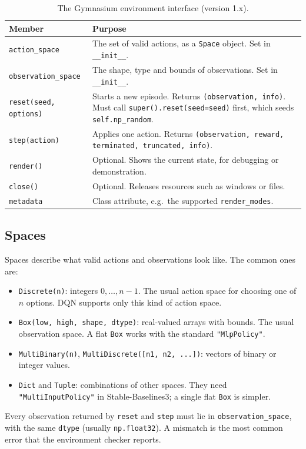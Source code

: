\documentclass[11pt,a4paper]{article}
\begin{document}
\begin{table}[h]
\centering\small
\caption{The Gymnasium environment interface (version 1.x).}
\label{tab:api}
\begin{tabularx}{\textwidth}{@{}p{4.1cm}L@{}}
\toprule
Member & Purpose \\
\midrule
\texttt{action\_space} & The set of valid actions, as a \texttt{Space} object. Set in \texttt{\_\_init\_\_}. \\
\texttt{observation\_space} & The shape, type and bounds of observations. Set in \texttt{\_\_init\_\_}. \\
\texttt{reset(seed, options)} & Starts a new episode. Returns \texttt{(observation, info)}. Must call \texttt{super().reset(seed=seed)} first, which seeds \texttt{self.np\_random}. \\
\texttt{step(action)} & Applies one action. Returns \texttt{(observation, reward, terminated, truncated, info)}. \\
\texttt{render()} & Optional. Shows the current state, for debugging or demonstration. \\
\texttt{close()} & Optional. Releases resources such as windows or files. \\
\texttt{metadata} & Class attribute, e.g.\ the supported \texttt{render\_modes}. \\
\bottomrule
\end{tabularx}
\end{table}

\subsection{Spaces}
Spaces describe what valid actions and observations look like. The common ones are:
\begin{itemize}
  \item \texttt{Discrete(n)}: integers $0, \dots, n-1$. The usual action space for choosing one of $n$ options. DQN supports only this kind of action space.
  \item \texttt{Box(low, high, shape, dtype)}: real-valued arrays with bounds. The usual observation space. A flat \texttt{Box} works with the standard \texttt{"MlpPolicy"}.
  \item \texttt{MultiBinary(n)}, \texttt{MultiDiscrete([n1, n2, ...])}: vectors of binary or integer values.
  \item \texttt{Dict} and \texttt{Tuple}: combinations of other spaces. They need \texttt{"MultiInputPolicy"} in Stable-Baselines3; a single flat \texttt{Box} is simpler.
\end{itemize}
Every observation returned by \texttt{reset} and \texttt{step} must lie in \texttt{observation\_space}, with the same \texttt{dtype} (usually \texttt{np.float32}). A mismatch is the most common error that the environment checker reports.
\end{document}
